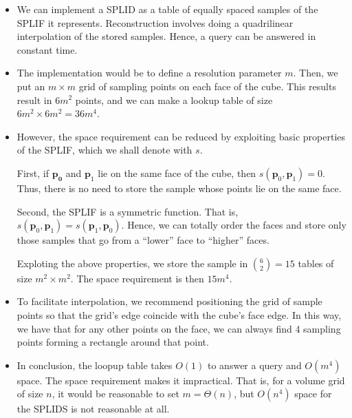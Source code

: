 \documentclass[10pt]{article}
\begin{document}
\begin{itemize}
    \item We can implement a SPLID as a table of equally
        spaced samples of the SPLIF it represents. 
        Reconstruction involves doing a quadrilinear interpolation
        of the stored samples. Hence, a query can
        be answered in constant time.
    
    \item The implementation would be to define a resolution
        parameter $m$. Then, we put an $m \times m$ grid of 
        sampling points on each face of the cube. This results
        result in $6m^2$ points, and we can make a lookup
        table of size $6m^2 \times 6m^2 = 36m^4$.
        
    \item However, the space requirement can be reduced by
        exploiting basic properties of the SPLIF, which we
        shall denote with $s$.
        
        First, if $\mathbf{p_0}$ and $\mathbf{p}_1$ lie
        on the same face of the cube, then 
        $s(\mathbf{p}_0, \mathbf{p}_1) = 0.$ Thus, there
        is no need to store the sample whose points lie
        on the same face.
        
        Second, the SPLIF is a symmetric function. That is,
        $s(\mathbf{p}_0,\mathbf{p}_1) = s(\mathbf{p}_1,\mathbf{p}_0).$
        Hence, we can totally order the faces and store
        only those samples that go from a ``lower'' face to 
        ``higher'' faces.
        
        Exploting the above properties, we store the sample
        in ${6 \choose 2} = 15$ tables of size $m^2 \times m^2$.
        The space requirement is then $15m^4$.
        
    \item To facilitate interpolation, we recommend positioning
        the grid of sample points so that the grid's edge coincide 
        with the cube's face edge. In this way, we have that for 
        any other points on the face, we can always find 4 
        sampling points forming a rectangle around that point.                    
    \item In conclusion, the loopup table takes $O(1)$ to answer
        a query and $O(m^4)$ space. The space requirement makes
        it impractical. That is, for a volume grid of size $n$,
        it would be reasonable to set $m = \Theta(n)$, 
        but $O(n^4)$ space for the SPLIDS is not reasonable at all.
\end{itemize}
\end{document}
